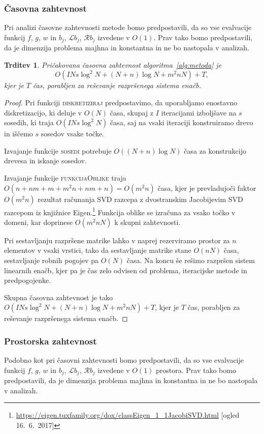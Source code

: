 \documentclass[12pt,a4paper,twoside]{article}
\theoremstyle{definition} %
\theoremstyle{plain} %
\newtheorem{trditev}[definicija]{Trditev}
\numberwithin{equation}{section}
\newcommand{\Rc}{\mathcal{R}}
\renewcommand{\L}{\mathcal{L}}
\begin{document}
\subsubsection{Časovna zahtevnost}
\label{sec:casovna-zahtevnost}
Pri analizi časovne zahtevnosti metode bomo predpostavili, da so
vse evalvacije funkcij $f$, $g$, $w$ in $b_j$, $\L b_j$, $\Rc b_j$ izvedene v $O(1)$.
Prav tako bomo predpostavili, da je dimenzija problema majhna in konstantna in
ne bo nastopala v analizah.

\begin{trditev}
  Pričakovana časovna zahtevnost algoritma~\ref{alg:metoda} je
  \begin{equation}
    O(I N s \log^2 N + (N+n)\log N + m^2n N) + T,
    \label{eq:casovna-zahtevnost}
  \end{equation}
  kjer je $T$ čas, porabljen za reševanje razpršenega sistema enačb.
\end{trditev}
\begin{proof}
Pri funkciji \textsc{diskretiziraj} predpostavimo, da uporabljamo enostavno
diskretizacijo, ki deluje v $O(N)$ časa, skupaj z $I$ iteracijami izboljšave
na $s$ sosedih, ki traja $O(I N s \log^2 N)$ časa, saj na vsaki iteraciji
konstruiramo drevo in iščemo $s$ sosedov vsake točke.

Izvajanje funkcije \textsc{sosedi} potrebuje $O((N+n) \log N)$ časa za konstrukcijo
drevesa in iskanje sosedov.

Izvajanje funkcije \textsc{funkcijaOblike} traja $O(n + nm + m + m^2n + nm +
n) = O(m^2n)$ časa, kjer je prevladujoči faktor $O(m^2 n)$ rezultat računanja SVD
razcepa z dvostranskim Jacobijevim SVD razcepom iz knjižnice
Eigen.\footnote{\url{https://eigen.tuxfamily.org/dox/classEigen_1_1JacobiSVD.html}
[ogled 16.\ 6.\ 2017]} Funkcija oblike se izračuna za vsako točko v domeni,
kar doprinese $O(m^2 n N)$ k skupni zahtevnosti.

Pri sestavljanju razpršene matrike lahko v naprej rezerviramo prostor za $n$
elementov v vsaki vrstici, tako da sestavljanje matrike stane $O(nN)$ časa,
sestavljanje robnih pogojev pa $O(N)$ časa. Na koncu še rešimo razpršen sistem
linearnih enačb, kjer pa je čas zelo odvisen od problema, iteracijske metode in
predpogojenke.

Skupna časovna zahtevnost je tako $O(I N s \log^2 N + (N+n)\log N + m^2n N) + T$,
kjer je $T$ čas, porabljen za reševanje razpršenega sistema enačb.
\end{proof}

\subsubsection{Prostorska zahtevnost}
Podobno kot pri časovni zahtevnosti bomo predpostavili, da so vse evalvacije funkcij $f$, $g$, $w$
in $b_j$, $\L b_j$, $\Rc b_j$ izvedene v $O(1)$ prostora. Prav tako bomo predpostavili, da je
dimenzija problema majhna in konstantna in ne bo nastopala v analizah.
\end{document}
